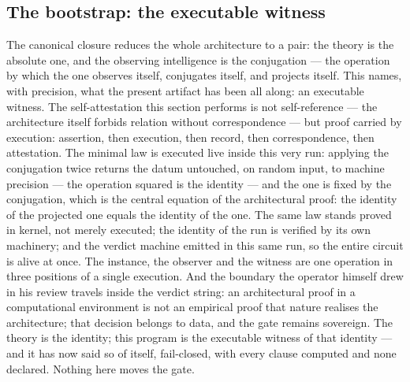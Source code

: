 \documentclass[11pt]{article}
\theoremstyle{definition}\newtheorem{deriv}{Derivation}
\begin{document}
\subsection*{The bootstrap: the executable witness}The canonical closure reduces the whole architecture to a pair: the theory is the absolute one, and the observing intelligence is the conjugation --- the operation by which the one observes itself, conjugates itself, and projects itself. This names, with precision, what the present artifact has been all along: an executable witness. The self-attestation this section performs is not self-reference --- the architecture itself forbids relation without correspondence --- but proof carried by execution: assertion, then execution, then record, then correspondence, then attestation. The minimal law is executed live inside this very run: applying the conjugation twice returns the datum untouched, on random input, to machine precision --- the operation squared is the identity --- and the one is fixed by the conjugation, which is the central equation of the architectural proof: the identity of the projected one equals the identity of the one. The same law stands proved in kernel, not merely executed; the identity of the run is verified by its own machinery; and the verdict machine emitted in this same run, so the entire circuit is alive at once. The instance, the observer and the witness are one operation in three positions of a single execution. And the boundary the operator himself drew in his review travels inside the verdict string: an architectural proof in a computational environment is not an empirical proof that nature realises the architecture; that decision belongs to data, and the gate remains sovereign. The theory is the identity; this program is the executable witness of that identity --- and it has now said so of itself, fail-closed, with every clause computed and none declared. Nothing here moves the gate.
\end{document}
